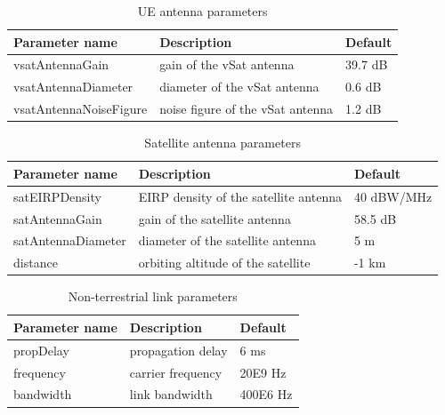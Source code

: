 \begin{table}[ht]
    \begin{small}
    \begin{tabular}{l|ll}
    \textbf{Parameter name} & \textbf{Description}             & \textbf{Default} \\ \hline
    vsatAntennaGain         & gain of the vSat antenna         & 39.7 dB          \\
    vsatAntennaDiameter     & diameter of the vSat antenna     & 0.6 dB           \\
    vsatAntennaNoiseFigure  & noise figure of the vSat antenna & 1.2 dB          
    \end{tabular}
    \end{small}
    \caption{UE antenna parameters}
    \label{tab:ue_params}
\end{table}

\begin{table}[ht]
    \begin{small}
    \begin{tabular}{l|ll}
    \textbf{Parameter name} & \textbf{Description}                  & \textbf{Default} \\ \hline
    satEIRPDensity          & EIRP density of the satellite antenna & 40 dBW/MHz       \\
    satAntennaGain          & gain of the satellite antenna         & 58.5 dB          \\
    satAntennaDiameter      & diameter of the satellite antenna     & 5 m              \\
    distance                & orbiting altitude of the satellite    & -1 km           
    \end{tabular}
    \end{small}
    \caption{Satellite antenna parameters}
    \label{tab:sat_params}
\end{table}

\begin{table}[ht]
    \begin{small}
    \begin{tabular}{l|ll}
    \textbf{Parameter name} & \textbf{Description} & \textbf{Default} \\ \hline
    propDelay               & propagation delay    & 6 ms             \\
    frequency               & carrier frequency    & 20E9 Hz          \\
    bandwidth               & link bandwidth       & 400E6 Hz        
    \end{tabular}
    \end{small}
    \caption{Non-terrestrial link parameters}
    \label{tab:link_params}
\end{table}


